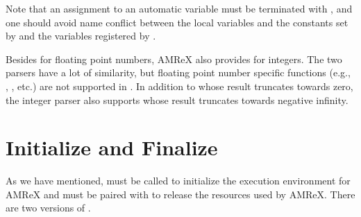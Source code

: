 \documentclass[letterpaper,10pt,english]{sphinxmanual}
\begin{document}
\begin{sphinxVerbatim}[commandchars=\\\{\}]
 
 
     
\end{sphinxVerbatim}

\sphinxAtStartPar
Note that an assignment to an automatic variable must be terminated with
\sphinxcode{\sphinxupquote{;}}, and one should avoid name conflict between the local variables and
the constants set by  and the variables registered by
.

\sphinxAtStartPar
Besides  for floating point numbers, AMReX also provides
 for integers.  The two parsers have a lot of
similarity, but floating point number specific functions (e.g., ,
, etc.) are not supported in .  In addition to \sphinxcode{\sphinxupquote{/}} whose
result truncates towards zero, the integer parser also supports \sphinxcode{\sphinxupquote{//}} whose
result truncates towards negative infinity.


\section{Initialize and Finalize}
\label{\detokenize{Basics:initialize-and-finalize}}\label{\detokenize{Basics:sec-basics-initialize}}
\sphinxAtStartPar
As we have mentioned,  must be called to initialize
the execution environment for AMReX and  must be paired
with  to release the resources used by AMReX.  There
are two versions of .
\end{document}
